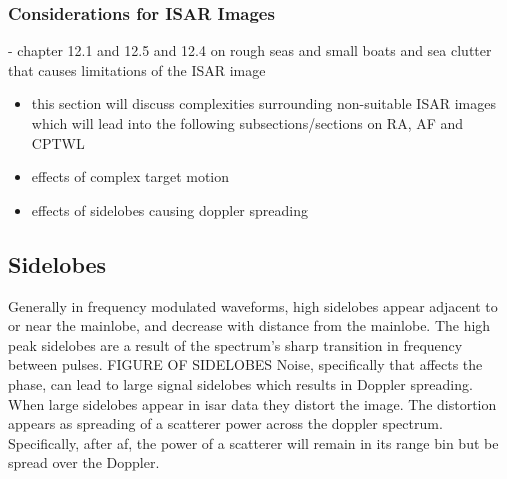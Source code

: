 \documentclass[class=report,11pt,crop=false]{standalone}
\begin{document}
    \subsubsection{Considerations for ISAR Images}
    - chapter 12.1 and 12.5 and 12.4 on rough seas and small boats and sea clutter that causes limitations of the ISAR image
    \begin{itemize}
        \item this section will discuss complexities surrounding non-suitable ISAR images which will lead into the following subsections/sections on RA, AF and CPTWL
        \item effects of complex target motion
        \item effects of sidelobes causing doppler spreading
    \end{itemize}

    \subsection{Sidelobes}
    Generally in frequency modulated waveforms, high sidelobes appear adjacent to or near the mainlobe, and decrease with distance from the mainlobe. The high peak sidelobes are a result of the spectrum’s sharp transition in frequency between pulses.
    FIGURE OF SIDELOBES
    Noise, specifically that affects the phase, can lead to large signal sidelobes which results in Doppler spreading. 
    When large sidelobes appear in \gls{isar} data they distort the image. The distortion appears as spreading of a scatterer power across the doppler spectrum. Specifically, after \gls{af}, the power of a scatterer will remain in its range bin but be spread over the Doppler. 
\end{document}

